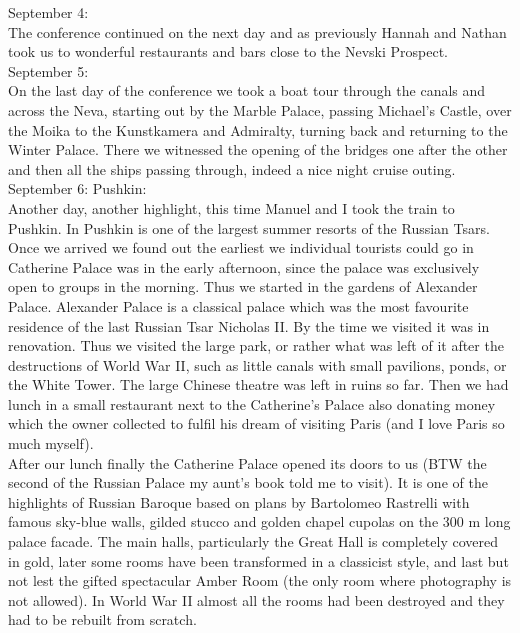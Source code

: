 September 4:\\
The conference continued on the next day and as previously Hannah and Nathan took us to wonderful restaurants and bars close to the Nevski Prospect.\\

September 5: \\
On the last day of the conference we took a boat tour through the canals and across the Neva, starting out by the Marble Palace, passing Michael's Castle, over the Moika to the Kunstkamera and Admiralty, turning back and returning to the Winter Palace. There we witnessed the opening of the bridges one after the other and then all the ships passing through, indeed a nice night cruise outing.\\

September 6: Pushkin:\\
Another day, another highlight, this time Manuel and I took the train to Pushkin. In Pushkin is one of the largest summer resorts of the Russian Tsars. Once we arrived we found out the earliest we individual tourists could go in Catherine Palace was in the early afternoon, since the palace was exclusively open to groups in the morning. Thus we started in the gardens of Alexander Palace. Alexander Palace is a classical palace which was the most favourite residence of the last Russian Tsar Nicholas II. By the time we visited it was in renovation. Thus we visited the large park, or rather what was left of it after the destructions of World War II, such as little canals with small pavilions, ponds, or the White Tower. The large Chinese theatre was left in ruins so far. Then we had lunch in a small restaurant next to the Catherine's Palace also donating money which the owner collected to fulfil his dream of visiting Paris (and I love Paris so much myself). \\
After our lunch finally the Catherine Palace opened its doors to us (BTW the second of the Russian Palace my aunt's book told me to visit). It is one of the highlights of Russian Baroque based on plans by Bartolomeo Rastrelli with famous sky-blue walls, gilded stucco and golden chapel cupolas on the 300 m long palace facade. The main halls, particularly the Great Hall is completely covered in gold, later some rooms have been transformed in a classicist style, and last but not lest the gifted spectacular Amber Room (the only room where photography is not allowed). In World War II almost all the rooms had been destroyed and they had to be rebuilt from scratch.\\
